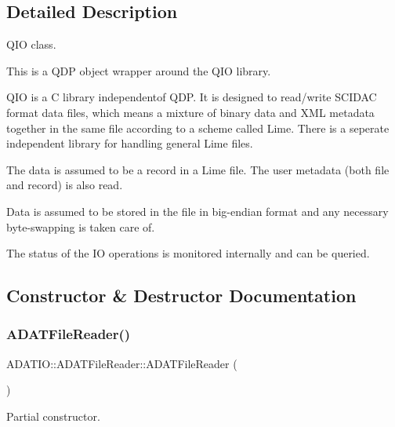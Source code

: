 \subsection{Detailed Description}
Q\+IO class. 

This is a Q\+DP object wrapper around the Q\+IO library.

Q\+IO is a C library independentof Q\+DP. It is designed to read/write S\+C\+I\+D\+AC format data files, which means a mixture of binary data and X\+ML metadata together in the same file according to a scheme called Lime. There is a seperate independent library for handling general Lime files.

The data is assumed to be a record in a Lime file. The user metadata (both file and record) is also read.

Data is assumed to be stored in the file in big-\/endian format and any necessary byte-\/swapping is taken care of.

The status of the IO operations is monitored internally and can be queried. 

\subsection{Constructor \& Destructor Documentation}
\mbox{\label{classADATIO_1_1ADATFileReader_ga800c009d1400eb965cc04a7f90bf4f24}} 
\subsubsection{\texorpdfstring{ADATFileReader()}{ADATFileReader()}\hspace{0.1cm}{\footnotesize\ttfamily [1/2]}}
{\footnotesize\ttfamily A\+D\+A\+T\+I\+O\+::\+A\+D\+A\+T\+File\+Reader\+::\+A\+D\+A\+T\+File\+Reader (\begin{DoxyParamCaption}{ }\end{DoxyParamCaption})}



Partial constructor. 

\mbox{\label{classADATIO_1_1ADATFileReader_ga54a5eea68d2a1c6f5b748f6ba75b7d22}} 
